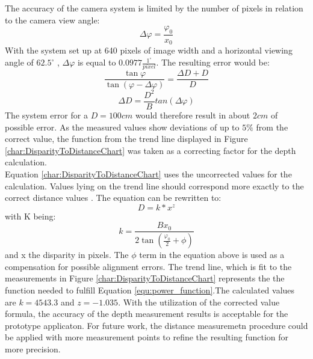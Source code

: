 The accuracy of the camera system is limited by the number of pixels in relation to the camera view angle:\\
\begin{equation}
\Delta\varphi=\frac{\varphi_0}{x_0}
\end{equation}
With the system set up at 640 pixels of image width and a horizontal viewing angle of $62.5^\circ$ , $\Delta\varphi$ is equal to $0.0977\frac{1^\circ}{pixel}$.
The resulting error would be:
\begin{equation}
\frac{\tan \varphi}{\tan(\varphi -\Delta\varphi)}=\frac{\Delta D+D}{D}
\end{equation}
\begin{equation}
\Delta D=\frac{D^{2}}{B} tan(\Delta\varphi)
\end{equation}
The system error for a $D=100cm$ would therefore result in about $2cm$ of possible error.
As the measured values show deviations of up to $5\%$ from the correct value, the function from the trend line displayed in Figure \ref{char:DisparityToDistanceChart} was taken as a correcting factor for the depth calculation.\\
Equation \ref{char:DisparityToDistanceChart} uses the uncorrected values for the calculation. Values lying on the trend line should correspond more exactly to the correct distance values \cite{ManafA.Mahammed.2013}. The equation can be rewritten to:
\begin{equation}
\label{equ:power_function}
D=k*x^{z}
\end{equation}
with K being:
\begin{equation}
k=\frac{Bx_0}{2\tan(\frac{\varphi_0}{2}+\phi)}
\end{equation}
and x the disparity in pixels.
The $\phi$ term in the equation above is used as a compensation for possible alignment errors.
The trend line, which is fit to the measurements in Figure \ref{char:DisparityToDistanceChart} represents the the function needed to fulfill Equation \ref{equ:power_function}.The calculated values are $k=4543.3$ and $z=-1.035$.
With the utilization of the corrected value formula, the accuracy of the depth measurement results is acceptable for the prototype applicaton. For future work, the distance measuremetn procedure could be applied with more measurement points to refine the resulting function for more precision.

